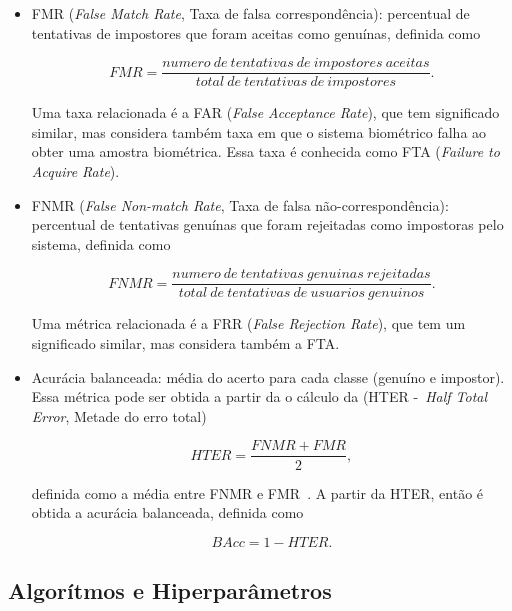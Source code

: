 \begin{itemize}
    \item FMR (\textit{False Match Rate}, Taxa de falsa correspondência): percentual de tentativas de impostores que foram aceitas como genuínas, definida como

          \begin{equation}\label{eqn:fmr}
              FMR = \frac{numero\:de\:tentativas\:de\:impostores\:aceitas}{total\:de\:tentativas\:de\:impostores}.
          \end{equation}

          Uma taxa relacionada é a FAR (\textit{False Acceptance Rate}), que tem significado similar, mas considera também taxa em que o sistema biométrico falha ao obter uma amostra biométrica. Essa taxa é conhecida como FTA (\textit{Failure to Acquire Rate}).


    \item FNMR (\textit{False Non-match Rate}, Taxa de falsa não-correspondência): percentual de tentativas genuínas que foram rejeitadas como impostoras pelo sistema, definida como

          \begin{equation}\label{eqn:fnmr}
              FNMR = \frac{numero\:de\:tentativas\:genuinas\:rejeitadas}{total\:de\:tentativas\:de\:usuarios\:genuinos}.
          \end{equation}

          Uma métrica relacionada é a FRR (\textit{False Rejection Rate}), que tem um significado similar, mas considera também a FTA.

    \item Acurácia balanceada: média do acerto para cada classe (genuíno e impostor). Essa métrica pode ser obtida a partir da o cálculo da (HTER -~\textit{Half Total Error}, Metade do erro total)

          \begin{equation}\label{eqn:hter}
              HTER = \frac{FNMR + FMR}{2},
          \end{equation}

          definida como a média entre FNMR e FMR~\cite{Roy2022systematic}. A partir da HTER, então é obtida a acurácia balanceada, definida como

          \begin{equation}\label{eqn:bacc}
              BAcc = 1 - HTER.
          \end{equation}

\end{itemize}

\subsection{Algorítmos e Hiperparâmetros}


